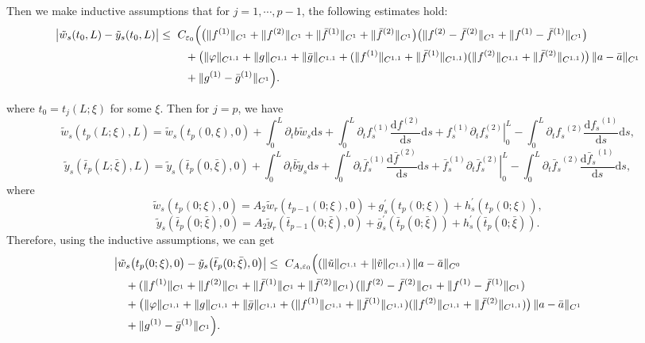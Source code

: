 \documentclass[a4paper,reqno,11pt]{amsart}
\numberwithin{equation}{section} %
\begin{document}
Then we make inductive assumptions that for $j=1,\cdots,p-1$, the following estimates hold:
\[
\begin{aligned}
\bigl|\tilde w_s(t_0,L)-\tilde y_s(t_0,L)\bigr|
\le{}&\ C_{\varepsilon_0}\Bigl(
  \bigl(\|f^{(1)}\|_{C^{1}}+\|f^{(2)}\|_{C^{1}}
       +\|\bar f^{(1)}\|_{C^{1}}+\|\bar f^{(2)}\|_{C^{1}}\bigr)
  \bigl(\|f^{(2)}-\bar f^{(2)}\|_{C^{1}}
       +\|f^{(1)}-\bar f^{(1)}\|_{C^{1}}\bigr)
\\
&\quad
  + \bigl(\|\varphi\|_{C^{1,1}}+\|g\|_{C^{1,1}}+\|\bar g\|_{C^{1,1}}
     + (\|f^{(1)}\|_{C^{1,1}}+\|\bar f^{(1)}\|_{C^{1,1}})
       (\|f^{(2)}\|_{C^{1,1}}+\|\bar f^{(2)}\|_{C^{1,1}})\bigr)
       \,\|a-\bar a\|_{C^{1}}
\\
&\quad
  + \|g^{(1)}-\bar g^{(1)}\|_{C^{1}}
\Bigr).
\end{aligned}
\]

where $t_0=t_j(L;\xi)$ for some $\xi$. Then for $j=p$, we have
$$
\tilde{w}_s\left( t_p(L;\xi ),L \right) =\tilde{w}_s(t_p(0,\xi ),0)+\int_0^L{\partial _tb\tilde{w}_s\mathrm{d}s}+\int_0^L{\partial _tf_{s}^{(1)}\frac{\mathrm{d}f^{(2)}}{\mathrm{d}s}\mathrm{d}s}+\left. f_{s}^{(1)}\partial _tf_{s}^{(2)} \right|_{0}^{L}-\int_0^L{\partial _t{f_s}^{(2)}\frac{\mathrm{d}{f_s}^{(1)}}{\mathrm{d}s}\mathrm{d}s},
$$
$$
\tilde{y}_s\left( \bar{t}_p(L;\bar{\xi}),L \right) =\tilde{y}_s(\bar{t}_p(0,\bar{\xi}),0)+\int_0^L{\partial _t\bar{b}\tilde{y}_s\mathrm{d}s}+\int_0^L{\partial _t\bar{f}_{s}^{(1)}\frac{\mathrm{d}\bar{f}^{(2)}}{\mathrm{d}s}\mathrm{d}s}+\left. \bar{f}_{s}^{(1)}\partial _t\bar{f}_{s}^{(2)} \right|_{0}^{L}-\int_0^L{\partial _t{\bar{f}_s}^{(2)}\frac{\mathrm{d}{\bar{f}_s}^{(1)}}{\mathrm{d}s}\mathrm{d}s},
$$
where
$$
\tilde{w}_s\left( t_p\left( 0;\xi \right) ,0 \right) =A_2\tilde{w}_r\left( t_{p-1}\left( 0;\xi \right) ,0 \right) +g_{s}^{\prime}\left( t_p(0;\xi ) \right) +h_{s}^{\prime}\left( t_p(0;\xi ) \right), 
$$
$$
\tilde{y}_s\left( \bar{t}_p\left( 0;\bar{\xi} \right) ,0 \right) =A_2\tilde{y}_r\left( \bar{t}_{p-1}\left( 0;\bar{\xi} \right) ,0 \right) +\bar{g}_{s}^{\prime}\left( \bar{t}_p(0;\bar{\xi}) \right) +h_{s}^{\prime}\left( \bar{t}_p(0;\bar{\xi}) \right) .
$$
Therefore, using the inductive assumptions, we can get
\[
\begin{aligned}
&\bigl|\tilde w_s\bigl(t_p(0;\xi),0\bigr)-\tilde y_s\bigl(\bar t_p(0;\bar\xi),0\bigr)\bigr|
\le{}\ C_{A,\varepsilon_0}\Bigl(
  (\|\tilde u\|_{C^{1,1}}+\|\tilde v\|_{C^{1,1}})\,\|a-\bar a\|_{C^{0}} \\
&\quad
  + (\|f^{(1)}\|_{C^{1}}+\|f^{(2)}\|_{C^{1}}
     +\|\bar f^{(1)}\|_{C^{1}}+\|\bar f^{(2)}\|_{C^{1}})\,
    (\|f^{(2)}-\bar f^{(2)}\|_{C^{1}}+\|f^{(1)}-\bar f^{(1)}\|_{C^{1}}) \\
&\quad
  + \bigl(\|\varphi\|_{C^{1,1}}+\|g\|_{C^{1,1}}+\|\bar g\|_{C^{1,1}}
     + (\|f^{(1)}\|_{C^{1,1}}+\|\bar f^{(1)}\|_{C^{1,1}})
       (\|f^{(2)}\|_{C^{1,1}}+\|\bar f^{(2)}\|_{C^{1,1}})\bigr)\,
    \|a-\bar a\|_{C^{1}} \\
&\quad
  + \|g^{(1)}-\bar g^{(1)}\|_{C^{1}}
\Bigr).
\end{aligned}
\]
\end{document}
